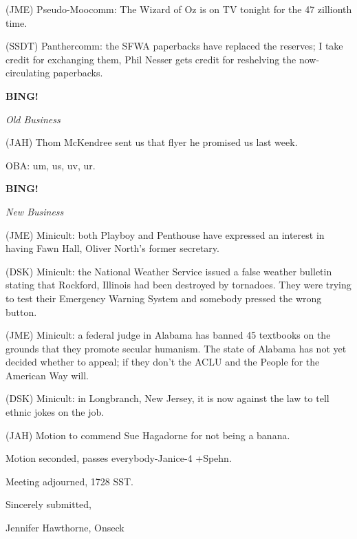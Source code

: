 \documentclass[12pt]{article}
\newcommand{\bing}{{\bf BING!} }
\newcommand{\goto}[1]{\bing \vskip 12pt \centerline{{\em{#1}}}}
\begin{document}
(JME) Pseudo-Moocomm: The Wizard of Oz is on TV tonight for the 47 zillionth time.

(SSDT) Panthercomm: the SFWA paperbacks have replaced the reserves; I take credit for exchanging them, Phil Nesser gets credit for reshelving the now-circulating paperbacks.

\goto{Old Business}

(JAH) Thom McKendree sent us that flyer he promised us last week.

OBA: um, us, uv, ur.

\goto{New Business}

(JME) Minicult: both Playboy and Penthouse have expressed an interest in having Fawn Hall, Oliver North's former secretary.

(DSK) Minicult: the National Weather Service issued a false weather bulletin stating that Rockford, Illinois had been destroyed by tornadoes. They were trying to test their Emergency Warning System and somebody pressed the wrong button.

(JME) Minicult: a federal judge in Alabama has banned 45 textbooks on the grounds that they promote secular humanism. The state of Alabama has not yet decided whether to appeal; if they don't the ACLU and the People for the American Way will.

(DSK) Minicult: in Longbranch, New Jersey, it is now against the law to tell ethnic jokes on the job.

(JAH) Motion to commend Sue Hagadorne for not being a banana.

Motion seconded, passes everybody-Janice-4 +Spehn.

\vspace{12pt}

\noindent
Meeting adjourned, 1728 SST.

\vspace{18pt}

\centerline{Sincerely submitted,}
\centerline{Jennifer Hawthorne, Onseck}
\end{document}
